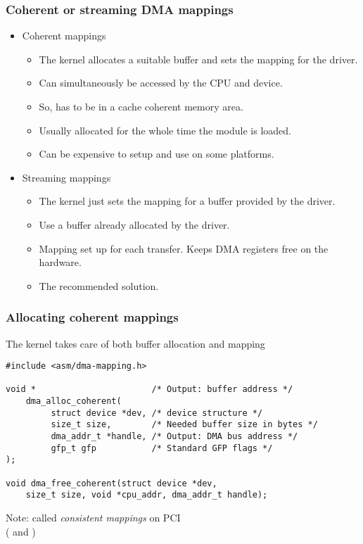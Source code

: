 \begin{frame}
  \frametitle{Coherent or streaming DMA mappings}
  \begin{itemize}
  \item Coherent mappings
    \begin{itemize}
    \item The kernel allocates a suitable buffer and sets the mapping
      for the driver.
    \item Can simultaneously be accessed by the CPU and device.
    \item So, has to be in a cache coherent memory area.
    \item Usually allocated for the whole time the module is loaded.
    \item Can be expensive to setup and use on some platforms.
    \end{itemize}
  \item Streaming mappings
    \begin{itemize}
    \item The kernel just sets the mapping for a buffer provided by
      the driver.
    \item Use a buffer already allocated by the driver.
    \item Mapping set up for each transfer. Keeps DMA registers free
      on the hardware.
    \item The recommended solution.
    \end{itemize}
  \end{itemize}
\end{frame}

\begin{frame}[fragile]
  \frametitle{Allocating coherent mappings}
  The kernel takes care of both buffer allocation and mapping
\begin{verbatim}
#include <asm/dma-mapping.h>

void *                       /* Output: buffer address */
    dma_alloc_coherent(
         struct device *dev, /* device structure */
         size_t size,        /* Needed buffer size in bytes */
         dma_addr_t *handle, /* Output: DMA bus address */
         gfp_t gfp           /* Standard GFP flags */
);

void dma_free_coherent(struct device *dev,
    size_t size, void *cpu_addr, dma_addr_t handle);
\end{verbatim}
Note: called {\em consistent mappings} on PCI\\
( and )
\end{frame}

